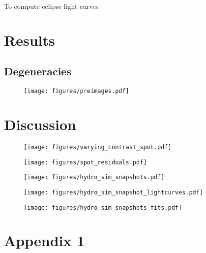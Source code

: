 \documentclass[modern]{aastex631}
\begin{document}
To compute eclipse light curves 
\section{Results}
\label{sec:results}

\subsection{Degeneracies}
\label{ssec:degeneracies}


\begin{figure}[t!]
    \begin{centering}
    \texttt{[image: figures/preimages.pdf]}
    \caption{}
    \label{fig:preimages}
    \end{centering}
\end{figure}





\section{Discussion}
\label{sec:discussion}

\begin{figure}[t!]
    \begin{centering}
    \texttt{[image: figures/varying\_contrast\_spot.pdf]}
    \caption{}
    \label{fig:varying_contrast_spot}
    \end{centering}
\end{figure}

\begin{figure}[t!]
    \begin{centering}
    \texttt{[image: figures/spot\_residuals.pdf]}
    \caption{}
    \label{fig:spot_residuals}
    \end{centering}
\end{figure}

\begin{figure}[t!]
    \begin{centering}
    \texttt{[image: figures/hydro\_sim\_snapshots.pdf]}
    \caption{}
    \label{fig:hydro_sim_snapshots:maps}
    \end{centering}
\end{figure}

\begin{figure}[t!]
    \begin{centering}
    \texttt{[image: figures/hydro\_sim\_snapshot\_lightcurves.pdf]}
    \caption{}
    \label{fig:hydro_sim_snapshots:lightcurves}
    \end{centering}
\end{figure}

\begin{figure}[t!]
    \begin{centering}
    \texttt{[image: figures/hydro\_sim\_snapshots\_fits.pdf]}
    \caption{}
    \label{fig:hydro_sim_snapshots_fits}
    \end{centering}
\end{figure}






\appendix
\section{Appendix 1}
\clearpage
\end{document}
